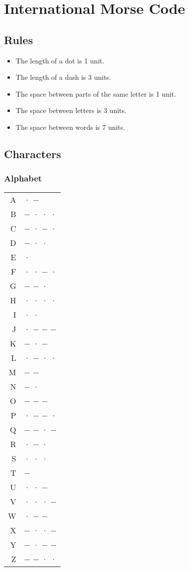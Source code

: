 \section{International Morse Code}

\small

	\subsection*{Rules}
	
		\begin{itemize}[noitemsep]
			\item The length of a dot is 1 unit.
			\item The length of a dash is 3 units.
			\item The space between parts of the same letter is 1 unit.
			\item The space between letters is 3 units.
			\item The space between words is 7 units.
		\end{itemize}

	\subsection*{Characters}

	\subsubsection*{Alphabet}
	
		\begin{tabular}{rl}
			A & · − \\ 
			B & − · · · \\ 
			C & − · − ·  \\ 
			D & − · ·  \\ 
			E & ·  \\ 
			F & · · − ·  \\ 
			G & − − ·  \\ 
			H & · · · ·  \\ 
			I & · ·  \\ 
			J & · − − −  \\ 
			K & − · −  \\ 
			L & · − · ·  \\ 
			M & − −  \\ 
			N & − ·  \\ 
			O & − − −  \\
			P & · − − ·  \\
			Q & − − · −  \\ 
			R & · − ·  \\ 
			S & · · ·  \\ 
			T & −  \\ 
			U & · · −  \\ 
			V & · · · −  \\ 
			W & · − −  \\ 
			X & − · · −  \\ 
			Y & − · − −  \\ 
			Z & − − · ·  \\ 
		\end{tabular}
	
